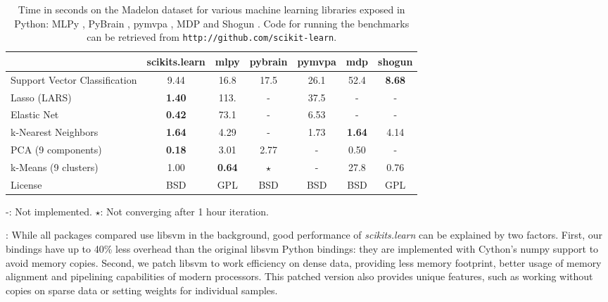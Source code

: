 \documentclass[twoside,11pt]{article}
\begin{document}
\begin{table}[t]
\small
\hspace*{.03\linewidth}%
\begin{tabular}{l c c c c c c}
\hline\hline %
 & scikits.learn & mlpy & pybrain & pymvpa &  mdp & shogun \\ [0.5ex]
\hline
Support Vector Classification & 9.44 & 16.8 & 17.5 & 26.1 & 52.4 & {\bf 8.68} \\
Lasso (LARS) & {\bf 1.40} & 113.   & - &  37.5 & - & - \\
Elastic Net & {\bf 0.42} & 73.1 & -  &  6.53  & -  & - \\
k-Nearest Neighbors & {\bf 1.64} & 4.29 & - &  1.73 & {\bf 1.64} & 4.14 \\
PCA (9 components) & {\bf 0.18} & 3.01  & 2.77  & - & 0.50  & - \\
k-Means (9 clusters) & 1.00 &  {\bf 0.64} & $\star$ & -  & 27.8 & 0.76 \\
License &  BSD & GPL & BSD  &  BSD  & BSD  & GPL \\
\hline
\end{tabular}

-: Not implemented. \hfill
$\star$: Not converging after 1 hour iteration.

\vspace*{-1.5ex}
\caption{\small
Time in seconds on the Madelon dataset for various machine learning libraries exposed in Python:
MLPy \citep{albanese2008}, PyBrain \citep{schaul2010}, pymvpa
\citep{hanke2009}, MDP \citep{zito2008} and Shogun
\citep{sonnenburg2010}. Code for running the
benchmarks can be retrieved from {\tt http://github.com/scikit-learn}.
\vspace*{-1.5em}\label{tab:comparisons}
}
\end{table}

\smallskip {}:
%
While all packages compared use libsvm in the background, good
performance of \emph{scikits.learn} can be explained by two factors.
First, our bindings have up to 40\% less overhead than the original
libsvm Python bindings: they are implemented with Cython's numpy support
to avoid memory copies. Second, we patch libsvm to work efficiency
on dense data, providing less memory footprint, better usage of memory
alignment and pipelining capabilities of modern processors. This patched
version also provides unique features, such as working without copies on
sparse data or setting weights for individual samples.
\end{document}

